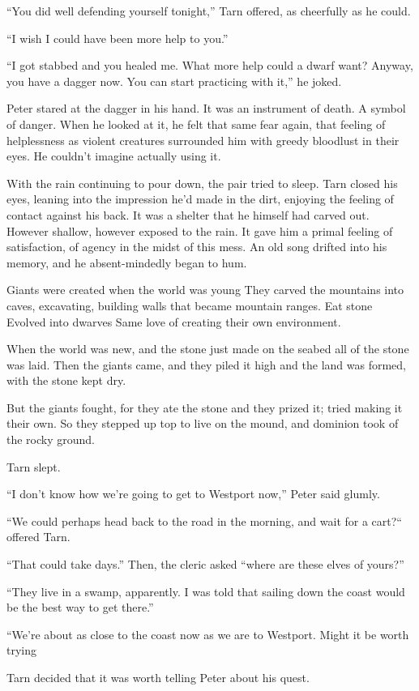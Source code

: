 ``You did well defending yourself tonight,'' Tarn offered, as cheerfully as he could.

``I wish I could have been more help to you.''

``I got stabbed and you healed me.  What more help could a dwarf want?  Anyway, you have a dagger now.  You can start practicing with it,'' he joked.

Peter stared at the dagger in his hand.  It was an instrument of death.  A symbol of danger.  When he looked at it, he felt that same fear again, that feeling of helplessness as violent creatures surrounded him with greedy bloodlust in their eyes.  He couldn't imagine actually using it.

With the rain continuing to pour down, the pair tried to sleep.  Tarn closed his eyes, leaning into the impression he'd made in the dirt, enjoying the feeling of contact against his back.  It was a shelter that he himself had carved out.  However shallow, however exposed to the rain.  It gave him a primal feeling of satisfaction, of agency in the midst of this mess.  An old song drifted into his memory, and he absent-mindedly began to hum.

\begin{verse}

\end{verse}

Giants were created when the world was young
They carved the mountains into caves, excavating, building walls that became mountain ranges.
Eat stone
Evolved into dwarves
Same love of creating their own environment.


When the world was new, and the stone just made
on the seabed all of the stone was laid.
Then the giants came, and they piled it high
and the land was formed, with the stone kept dry.

But the giants fought, for they ate the stone
and they prized it; tried making it their own.
So they stepped up top to live on the mound,
and dominion took of the rocky ground.




Tarn slept.


``I don't know how we're going to get to Westport now,'' Peter said glumly.

``We could perhaps head back to the road in the morning, and wait for a cart?`` offered Tarn.

``That could take days.''  Then, the cleric asked ``where are these elves of yours?''

``They live in a swamp, apparently.  I was told that sailing down the coast would be the best way to get there.''

``We're about as close to the coast now as we are to Westport.  Might it be worth trying 

Tarn decided that it was worth telling Peter about his quest.